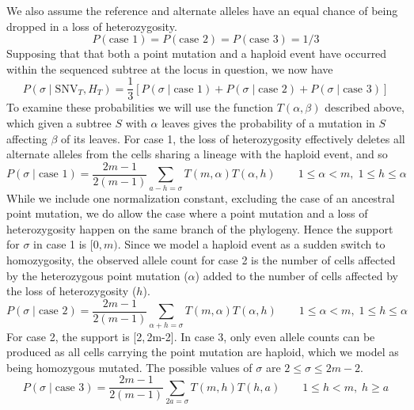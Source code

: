 \documentclass[../../main.tex]{subfiles}
\begin{document}
We also assume the reference and alternate alleles have an equal chance of being dropped in a loss of heterozygosity.
\begin{equation*}
P(\text{case 1})=P(\text{case 2}) = P(\text{case 3}) = 1/3
\end{equation*}
Supposing that that both a point mutation and a haploid event have occurred within the sequenced subtree at the locus in question, we now have
\begin{equation*}
P(\sigma\mid\text{SNV}_T,H_T)=\frac{1}{3}\left[P(\sigma\mid\text{case 1})+P(\sigma\mid\text{case 2})+P(\sigma\mid\text{case 3})\right]
\end{equation*}
To examine these probabilities we will use the function $T(\alpha,\beta)$ described above, which given a subtree $S$ with $\alpha$ leaves gives the probability of a mutation in $S$ affecting $\beta$ of its leaves.
For case 1, the loss of heterozygosity effectively deletes all alternate alleles from the cells sharing a lineage with the haploid event, and so
\begin{equation*}
P(\sigma\mid\text{case 1}) = \frac{2m-1}{2(m-1)}\sum_{a-h=\sigma}T(m,\alpha)T(\alpha,h)\qquad 1\leq \alpha < m,\;1\leq h\leq\alpha 
\end{equation*}
While we include one normalization constant, excluding the case of an ancestral point mutation, we do allow the case where a point mutation and a loss of heterozygosity happen on the same branch of the phylogeny.
Hence the support for $\sigma$ in case 1 is $[0,m)$.
Since we model a haploid event as a sudden switch to homozygosity, the observed allele count for case 2 is the number of cells affected by the heterozygous point mutation ($\alpha$) added to the number of cells affected by the loss of heterozygosity ($h$).
\begin{equation*}
P(\sigma\mid\text{case 2}) = \frac{2m-1}{2(m-1)}\sum_{\alpha+h=\sigma}T(m,\alpha)T(\alpha,h) \qquad 1\leq \alpha < m,\;1\leq h\leq\alpha 
\end{equation*}
For case 2, the support is [2,\,2m-2].
In case 3, only even allele counts can be produced as all cells carrying the point mutation are haploid, which we model as being homozygous mutated.
The possible values of $\sigma$ are $2\leq\sigma\leq 2m-2$.
\begin{equation*}
P(\sigma\mid\text{case 3}) = \frac{2m-1}{2(m-1)}\sum_{2a=\sigma} T(m,h)T(h,a) \qquad 1\leq h < m,\; h\geq a
\end{equation*}
\end{document}
